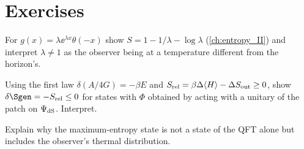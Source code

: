 \section*{Exercises}
\begin{exercise}
For $g(x)=\lambda\ee^{\lambda x}\theta(-x)$ show $S=1-1/\lambda-\log\lambda$ (\cref{ch:entropy_II}) and interpret $\lambda\ne1$ as the observer being at a temperature different from the horizon's.
\end{exercise}
\begin{exercise}
Using the first law $\delta(A/4G)=-\beta E$ and $S_{\rm rel}=\beta\Delta\langle H\rangle-\Delta S_{\rm out}\ge0$, show $\delta\Sgen=-S_{\rm rel}\le0$ for states with $\Phi$ obtained by acting with a unitary of the patch on $\Psi_{\rm dS}$. Interpret.
\end{exercise}
\begin{exercise}
Explain why the maximum-entropy state is not a state of the QFT alone but includes the observer's thermal distribution.
\end{exercise}
